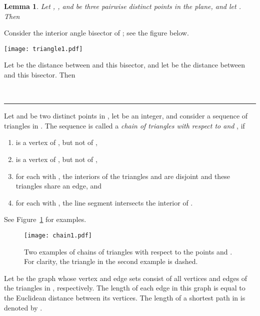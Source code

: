 \documentclass[12pt]{article}
\newtheorem{lemma}{Lemma}
\newcommand{\qed}{\rule{0.5em}{1.5ex}}
\newcommand{\fqed}{{\hfill~\qed}}
\newenvironment{proof}{{\noindent \bf Proof.}}
                      {{\hfill \fqed} \vspace{1em}}
\begin{document}
\begin{lemma}  \label{lemtriangle}  
Let , , and  be three pairwise distinct points in the plane, 
and let . Then 
 
\end{lemma} 
\begin{proof} 
Consider the interior angle bisector of ; see the figure below. 

\begin{center}
\texttt{[image: triangle1.pdf]}
\end{center}

Let  be the distance between  and this bisector, and let 
 be the distance between  and this bisector. Then 

\end{proof} 

Let  and  be two distinct points in , let  be 
an integer, and consider a sequence 
 of triangles in . The 
sequence  is called a 
\emph{chain of triangles with respect to  and }, if 
\begin{enumerate} 
\item  is a vertex of , but not of ,  
\item  is a vertex of , but not of ,  
\item for each  with , the interiors of the triangles 
       and  are disjoint and these triangles share an edge,
      and 
\item for each  with , the line segment  
      intersects the interior of . 
\end{enumerate} 
See Figure~\ref{figchain} for examples. 

\begin{figure}
\begin{center}
\texttt{[image: chain1.pdf]}
\end{center}
\caption{Two examples of chains of triangles with respect to the points 
          and . For clarity, the triangle  in the second 
         example is dashed.} 
\label{figchain}
\end{figure}

Let  be the graph whose vertex and edge sets consist of 
all vertices and edges of the  triangles in , 
respectively. The length of each edge in this graph is equal to the 
Euclidean distance between its vertices. The length of a shortest path 
in  is denoted by . 
\end{document}
